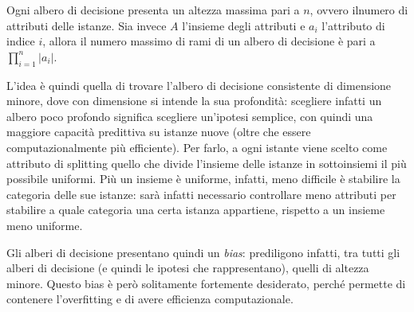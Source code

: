 Ogni albero di decisione presenta un altezza massima pari a $n$, ovvero ilnumero
di attributi delle istanze.
Sia invece $A$ l'insieme degli attributi e $a_i$ l'attributo di indice $i$,
allora il numero massimo di rami di un albero di decisione è pari a
$\prod_{i=1}^{n} |a_i|$.

L'idea è quindi quella di trovare l'albero di decisione consistente di
dimensione minore, dove con dimensione si intende la sua profondità: scegliere
infatti un albero poco profondo significa scegliere un'ipotesi semplice, con
quindi una maggiore capacità predittiva su istanze nuove (oltre che essere
computazionalmente più efficiente).
Per farlo, a ogni istante viene scelto come attributo di splitting quello che
divide l'insieme delle istanze in sottoinsiemi il più possibile uniformi.
Più un insieme è uniforme, infatti, meno difficile è stabilire la categoria
delle sue istanze: sarà infatti necessario controllare meno attributi per
stabilire a quale categoria una certa istanza appartiene, rispetto a un insieme
meno uniforme.

Gli alberi di decisione presentano quindi un \textit{bias}: prediligono infatti,
tra tutti gli alberi di decisione (e quindi le ipotesi che rappresentano),
quelli di altezza minore. Questo bias è però solitamente fortemente desiderato,
perché permette di contenere l'overfitting e di avere efficienza computazionale.

